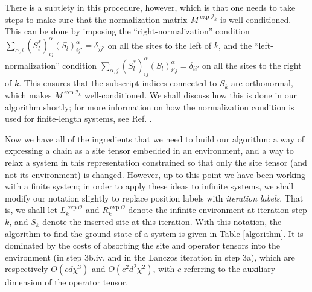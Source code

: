 \documentclass[12pt]{amsbook}
\theoremstyle{plain}
\theoremstyle{definition}
\theoremstyle{remark}
\newcommand{\paren}[1]{\left(#1\right)}
\newcommand{\mexp}[1]{\exp{\mathcal{#1}}}
\begin{document}
There is a subtlety in this procedure, however, which is that one needs to take steps to make sure that the normalization matrix $M^{\mexp{I}_k}$ is well-conditioned.  This can be done by imposing the ``right-normalization'' condition $\sum_{\alpha,i}\paren{S_{l}^*}^{\alpha}_{ij}\paren{S_{l}}^{\alpha}_{ij'}=\delta_{jj'}$ on all the sites to the left of $k$, and the ``left-normalization'' condition $\sum_{\alpha,j}\paren{S_{l}^*}^{\alpha}_{ij}\paren{S_{l}}^{\alpha}_{i'j}=\delta_{ii'}$ on all the sites to the right of $k$.  This ensures that the subscript indices connected to $S_k$ are orthonormal, which makes $M^{\mexp{I}_k}$ well-conditioned.  We shall discuss how this is done in our algorithm shortly;  for more information on how the normalization condition is used for finite-length systems, see Ref. \cite{cond-mat/0404706}.

Now we have all of the ingredients that we need to build our algorithm:  a way of expressing a chain as a site tensor embedded in an environment, and a way to relax a system in this representation constrained so that only the site tensor (and not its environment) is changed.  However, up to this point we have been working with a finite system; in order to apply these ideas to infinite systems, we shall modify our notation slightly to replace position labels with \emph{iteration labels}.  That is, we shall let $L^{\mexp{O}}_k$ and $R^{\mexp{O}}_k$ denote the infinite environment
at iteration step $k$, and $S_k$ denote the inserted site at this iteration.  With this notation, the algorithm to find the ground state of a system is given in Table \ref{algorithm}. It is dominated by the costs of absorbing the site and operator tensors into the environment (in step 3b.iv, and in the Lanczos iteration in step 3a), which are respectively $O(cd\chi^3)$ and $O(c^2d^2\chi^2)$, with $c$ referring to the auxiliary dimension of the operator tensor.
\end{document}

